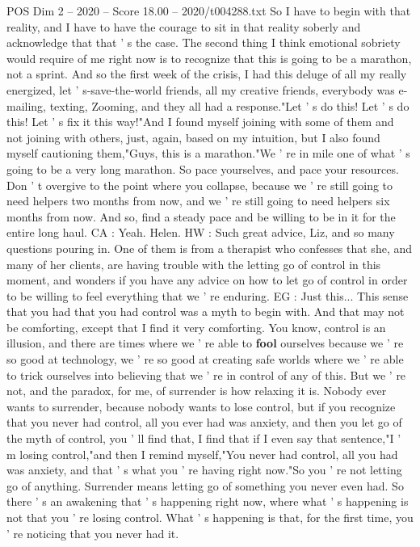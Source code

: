 \begin{textsample}{POS Dim 2 – 2020 – Score 18.00 – 2020/t004288.txt}
So I have to begin with that reality, and I have to have the courage to sit in that reality soberly and acknowledge that that ' s the case.
The second thing I think emotional sobriety would require of me right now is to recognize that this is going to be a marathon, not a sprint.
And so the first week of the crisis, I had this deluge of all my really energized, let ' s-save-the-world friends, all my creative friends, everybody was e-mailing, texting, Zooming, and they all had a response."Let ' s do this!
Let ' s do this!
Let ' s fix it this way!"And I found myself joining with some of them and not joining with others, just, again, based on my intuition, but I also found myself cautioning them,"Guys, this is a marathon."We ' re in mile one of what ' s going to be a very long marathon.
So pace yourselves, and pace your resources.
Don ' t overgive to the point where you collapse, because we ' re still going to need helpers two months from now, and we ' re still going to need helpers six months from now.
And so, find a steady pace and be willing to be in it for the entire long haul.
CA : Yeah.
Helen.
HW : Such great advice, Liz, and so many questions pouring in.
One of them is from a therapist who confesses that she, and many of her clients, are having trouble with the letting go of control in this moment, and wonders if you have any advice on how to let go of control in order to be willing to feel everything that we ' re enduring.
EG : Just this...
This sense that you had that you had control was a myth to begin with.
And that may not be comforting, except that I find it very comforting.
You know, control is an illusion, and there are times where we ' re able to \textbf{fool} ourselves because we ' re so good at technology, we ' re so good at creating safe worlds where we ' re able to trick ourselves into believing that we ' re in control of any of this.
But we ' re not, and the paradox, for me, of surrender is how relaxing it is.
Nobody ever wants to surrender, because nobody wants to lose control, but if you recognize that you never had control, all you ever had was anxiety, and then you let go of the myth of control, you ' ll find that, I find that if I even say that sentence,"I ' m losing control,"and then I remind myself,"You never had control, all you had was anxiety, and that ' s what you ' re having right now."So you ' re not letting go of anything.
Surrender means letting go of something you never even had.
So there ' s an awakening that ' s happening right now, where what ' s happening is not that you ' re losing control.
What ' s happening is that, for the first time, you ' re noticing that you never had it.

\end{textsample}

